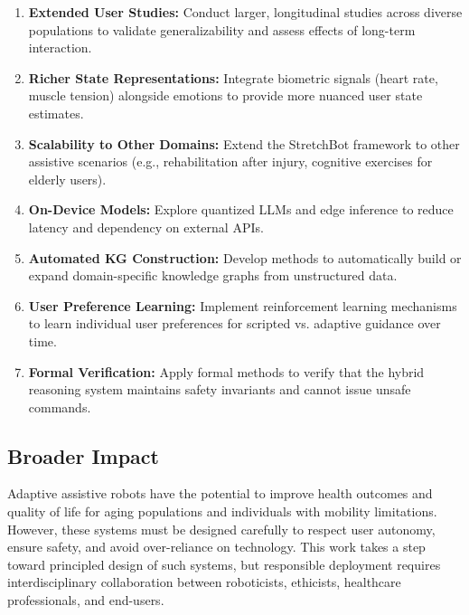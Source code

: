 \begin{enumerate}
\item \textbf{Extended User Studies:} Conduct larger, longitudinal studies across diverse populations to validate generalizability and assess effects of long-term interaction.

\item \textbf{Richer State Representations:} Integrate biometric signals (heart rate, muscle tension) alongside emotions to provide more nuanced user state estimates.

\item \textbf{Scalability to Other Domains:} Extend the StretchBot framework to other assistive scenarios (e.g., rehabilitation after injury, cognitive exercises for elderly users).

\item \textbf{On-Device Models:} Explore quantized LLMs and edge inference to reduce latency and dependency on external APIs.

\item \textbf{Automated KG Construction:} Develop methods to automatically build or expand domain-specific knowledge graphs from unstructured data.

\item \textbf{User Preference Learning:} Implement reinforcement learning mechanisms to learn individual user preferences for scripted vs. adaptive guidance over time.

\item \textbf{Formal Verification:} Apply formal methods to verify that the hybrid reasoning system maintains safety invariants and cannot issue unsafe commands.
\end{enumerate}

\subsection{Broader Impact}

Adaptive assistive robots have the potential to improve health outcomes and quality of life for aging populations and individuals with mobility limitations. However, these systems must be designed carefully to respect user autonomy, ensure safety, and avoid over-reliance on technology. This work takes a step toward principled design of such systems, but responsible deployment requires interdisciplinary collaboration between roboticists, ethicists, healthcare professionals, and end-users.
